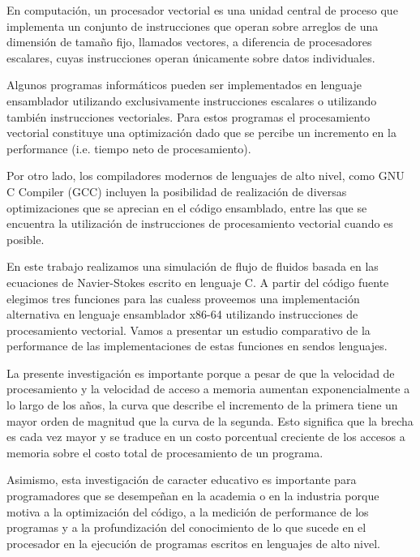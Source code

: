 En computación, un procesador vectorial es una unidad central de proceso que implementa un conjunto de instrucciones que operan sobre arreglos de una dimensión de tamaño fijo, llamados vectores, a diferencia de procesadores escalares, cuyas instrucciones operan únicamente sobre datos individuales.
\par Algunos programas informáticos pueden ser implementados en lenguaje ensamblador utilizando exclusivamente instrucciones escalares o utilizando también instrucciones vectoriales. Para estos programas el procesamiento vectorial constituye una optimización dado que se percibe un incremento en la performance (i.e. tiempo neto de procesamiento).
\par Por otro lado, los compiladores modernos de lenguajes de alto nivel, como GNU C Compiler (GCC) incluyen la posibilidad de realización de diversas optimizaciones que se aprecian en el código ensamblado, entre las que se encuentra la utilización de instrucciones de procesamiento vectorial cuando es posible.
\par En este trabajo realizamos una simulación de flujo de fluidos basada en las ecuaciones de Navier-Stokes escrito en lenguaje C. A partir del código fuente elegimos tres funciones para las cualess proveemos una implementación alternativa en lenguaje ensamblador x86-64 utilizando instrucciones de procesamiento vectorial. Vamos a presentar un estudio comparativo de la performance de las implementaciones de estas funciones en sendos lenguajes.
\par La presente investigación es importante porque a pesar de que la velocidad de procesamiento y la velocidad de acceso a memoria aumentan exponencialmente a lo largo de los años, la curva que describe el incremento de la primera tiene un mayor orden de magnitud que la curva de la segunda. Esto significa que la brecha es cada vez mayor y se traduce en un costo porcentual creciente de los accesos a memoria sobre el costo total de procesamiento de un programa.
\par Asimismo, esta investigación de caracter educativo es importante para programadores que se desempeñan en la academia o en la industria porque motiva a la optimización del código, a la medición de performance de los programas y a la profundización del conocimiento de lo que sucede en el procesador en la ejecución de programas escritos en lenguajes de alto nivel.
